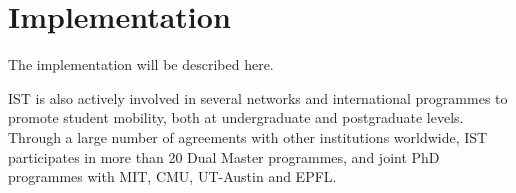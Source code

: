 \section{Implementation}
\label{sec:Implementation}
The implementation will be described here.

IST is also actively involved in several networks and international programmes to promote student mobility, both at undergraduate and postgraduate levels. Through a large number of agreements with other institutions worldwide, IST participates in more than 20 Dual Master programmes, and joint PhD programmes with MIT, CMU, UT-Austin and EPFL.


